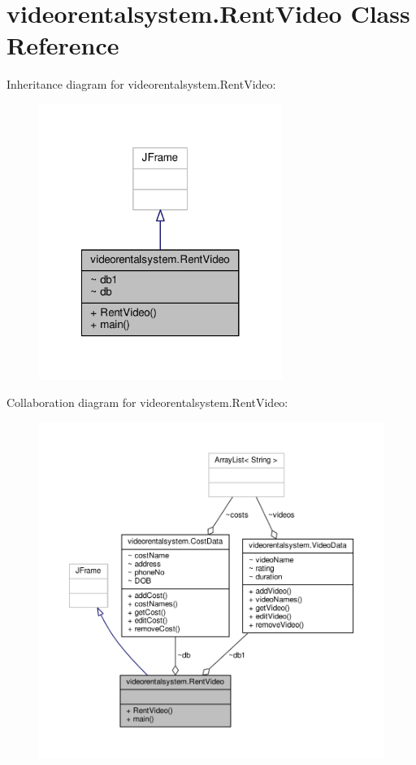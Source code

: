\hypertarget{classvideorentalsystem_1_1RentVideo}{\section{videorentalsystem.\-Rent\-Video Class Reference}
\label{classvideorentalsystem_1_1RentVideo}
}


Inheritance diagram for videorentalsystem.\-Rent\-Video\-:
\nopagebreak
\begin{figure}[H]
\begin{center}
\leavevmode
\includegraphics[width=224pt]{classvideorentalsystem_1_1RentVideo__inherit__graph}
\end{center}
\end{figure}


Collaboration diagram for videorentalsystem.\-Rent\-Video\-:
\nopagebreak
\begin{figure}[H]
\begin{center}
\leavevmode
\includegraphics[width=350pt]{classvideorentalsystem_1_1RentVideo__coll__graph}
\end{center}
\end{figure}
